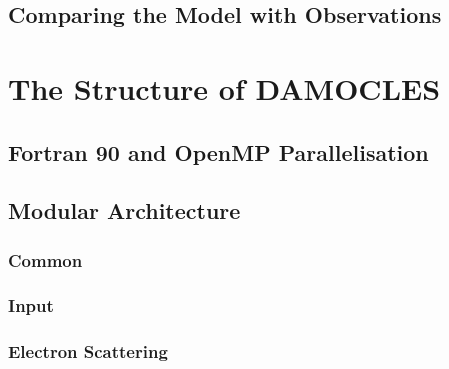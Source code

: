 \subsection{Comparing the Model with Observations}
	
\section{The Structure of DAMOCLES}
\label{damocles_struct}
	\subsection{Fortran 90 and OpenMP Parallelisation}
	\subsection{Modular Architecture} %
	\clearpage
	\begin{centering}
	\end{centering}
	\clearpage

		\subsubsection{Common}
		\subsubsection{Input}
		\subsubsection{Electron Scattering}
